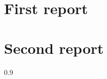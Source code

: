 \documentclass[a4paper,12pt,times,numbered,print]{Classes/PhDThesisPSnPDF}
\begin{document}
\frontmatter

\maketitle





\tableofcontents

\listoffigures

\listoftables

\mainmatter

\part{First report}









\part{Second report}









\begin{spacing}{0.9}

\cleardoublepage

\end{spacing}

\begin{appendices}





\end{appendices}
\end{document}
